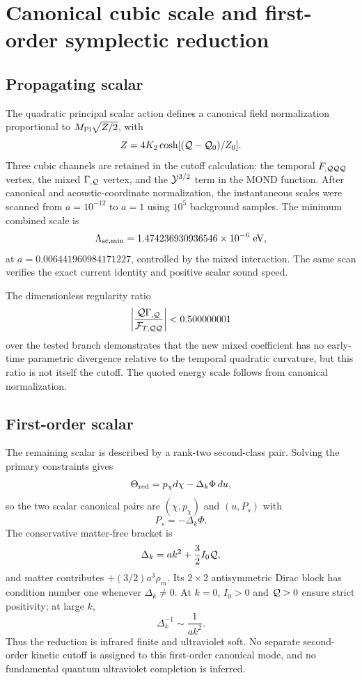 \section{Canonical cubic scale and first-order symplectic reduction}\label{app:cutoff}
\subsection{Propagating scalar}
The quadratic principal scalar action defines a canonical field normalization proportional to $M_{\rm Pl}\sqrt{Z/2}$, with
\begin{equation}
Z=4K_2\cosh[(\mathcal{Q}-\mathcal{Q}_0)/Z_0].
\end{equation}
Three cubic channels are retained in the cutoff calculation: the temporal $F_{,\mathcal{Q}\mathcal{Q}\mathcal{Q}}$ vertex, the mixed $\Gamma_{,\mathcal{Q}}$ vertex, and the $\mathcal{Y}^{3/2}$ term in the MOND function. After canonical and acoustic-coordinate normalization, the instantaneous scales were scanned from $a=10^{-12}$ to $a=1$ using $10^5$ background samples. The minimum combined scale is
\begin{equation}
\Lambda_{\rm sc,min}=1.474236930936546\times10^{-6}\ {\rm eV},
\end{equation}
at $a=0.006441960984171227$, controlled by the mixed interaction. The same scan verifies the exact current identity and positive scalar sound speed.

The dimensionless regularity ratio
\begin{equation}
\left|\frac{\mathcal{Q}\Gamma_{,\mathcal{Q}}}{\mathcal{F}_{T,\mathcal{Q}\mathcal{Q}}}\right|<0.500000001
\end{equation}
over the tested branch demonstrates that the new mixed coefficient has no early-time parametric divergence relative to the temporal quadratic curvature, but this ratio is not itself the cutoff. The quoted energy scale follows from canonical normalization.

\subsection{First-order scalar}
The remaining scalar is described by a rank-two second-class pair. Solving the primary constraints gives
\begin{equation}
\Theta_{\rm red}=p_\chi d\chi-\Delta_k\Phi\,du,
\end{equation}
so the two scalar canonical pairs are $(\chi,p_\chi)$ and $(u,P_s)$ with
\begin{equation}
P_s=-\Delta_k\Phi.
\end{equation}
The conservative matter-free bracket is
\begin{equation}
\Delta_k=ak^2+\frac32I_0\mathcal{Q},
\end{equation}
and matter contributes $+(3/2)a^3\rho_m$. Its $2\times2$ antisymmetric Dirac block has condition number one whenever $\Delta_k\neq0$. At $k=0$, $I_0>0$ and $\mathcal{Q}>0$ ensure strict positivity; at large $k$,
\begin{equation}
\Delta_k^{-1}\sim\frac{1}{ak^2}.
\end{equation}
Thus the reduction is infrared finite and ultraviolet soft. No separate second-order kinetic cutoff is assigned to this first-order canonical mode, and no fundamental quantum ultraviolet completion is inferred.
